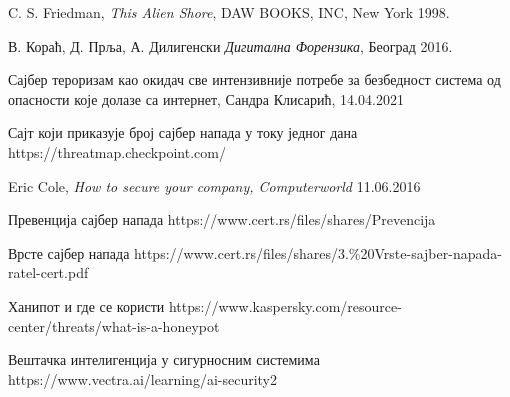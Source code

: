 \documentclass[a4paper]{article}
\begin{document}
\newpage
    \appendix

     
    

    \begin{thebibliography}{9}

    C. S. Friedman, \emph{This Alien Shore}, DAW BOOKS, INC, New York 1998.

    В. Кораћ, Д. Прља, А. Дилигенски \emph{Дигитална Форензика}, Београд 2016.
    
    Сајбер тероризам као окидач све интензивније потребе за безбедност система од опасности које долазе са интернет, Сандра Клисарић, 14.04.2021
	  
     Сајт који приказује број сајбер напада у току једног дана https://threatmap.checkpoint.com/
	  
    Eric Cole, \emph{How to secure your company, Computerworld} 11.06.2016 
	  
    Превенција сајбер напада https://www.cert.rs/files/shares/Prevencija%
	  
    Врсте сајбер напада https://www.cert.rs/files/shares/3.\%20Vrste-sajber-napada-ratel-cert.pdf
	  
    Ханипот и где се користи https://www.kaspersky.com/resource-center/threats/what-is-a-honeypot
	  
     Вештачка интелигенција у сигурносним системима https://www.vectra.ai/learning/ai-security2
    
    \end{thebibliography}
	
    \appendix
\end{document}
